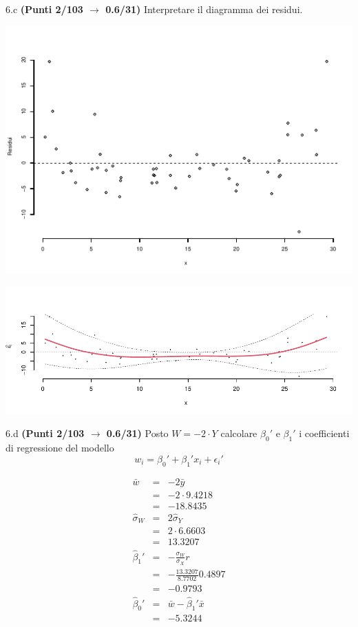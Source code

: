 \documentclass[
  11pt,
]{book}
\theoremstyle{mytheoremstyle}
\theoremstyle{mydefstyle}
\newenvironment{sol}
  {
  \begin{tcolorbox}[enhanced,breakable,arc=0.1mm,boxrule=1pt,colback=white,colframe=iblue,
  title=\bf \fontfamily{lmss}\selectfont \hspace{.5 cm} Soluzione,drop fuzzy shadow]

}{
\end{tcolorbox}
  }
\begin{document}
6.c \textbf{(Punti 2/103 \(\rightarrow\) 0.6/31)} Interpretare il diagramma dei residui.

\begin{center}\includegraphics{Esami_passati_con_soluzioni_files/figure-latex/2023-47,-1} \end{center}

\begin{sol}

\begin{center}\includegraphics{Esami_passati_con_soluzioni_files/figure-latex/2023-48,-1} \end{center}

\end{sol}

6.d \textbf{(Punti 2/103 \(\rightarrow\) 0.6/31)} Posto \(W=-2\cdot Y\) calcolare \(\beta_0'\) e \(\beta_1'\) i coefficienti di regressione del modello
\[
w_i = \beta_0'+\beta_1'x_i+\epsilon_i'
\]

\begin{sol}
\begin{eqnarray*}
  \bar w &=&  -2\bar y\\
  &=& -2\cdot9.4218\\
  &=& -18.8435\\
  \hat\sigma_W&=&2\hat\sigma_Y\\
  &=& 2\cdot6.6603\\
  &=& 13.3207\\
  \hat\beta_1' &=& -\frac{\sigma_W}{\sigma_X}r\\
  &=& -\frac{13.3207}{8.7702}0.4897\\
  &=& -0.9793\\
  \hat\beta_0'&=& \bar w - \hat\beta_1'\bar x\\
  &=& -5.3244
\end{eqnarray*}

\end{sol}
\end{document}
